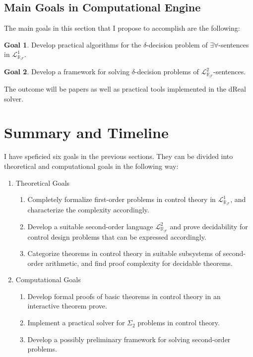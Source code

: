 \documentclass[10pt]{article}
\newcommand{\lrf}{\mathcal{L}_{\mathbb{R}_{\mathcal{F}}}}
\theoremstyle{definition}
\newtheorem{goal}{Goal}
\begin{document}
\subsection{Main Goals in Computational Engine}

The main goals in this section that I propose to accomplish are the following:
\begin{goal}
Develop practical algorithms for the $\delta$-decision problem of $\exists\forall$-sentences in $\lrf^1$.
\end{goal}
\begin{goal}
Develop a framework for solving $\delta$-decision problems of $\lrf^2$-sentences.
\end{goal}
The outcome will be papers as well as practical tools implemented in the dReal solver. 

\section{Summary and Timeline}\label{summary}

I have speficied six goals in the previous sections. They can be divided into theoretical and computational goals in the following way:
\begin{enumerate}
\item Theoretical Goals
\begin{enumerate}
\item Completely formalize first-order problems in control theory in $\lrf^1$, and characterize the complexity accordingly. 
\item Develop a suitable second-order language $\lrf^2$ and prove decidability for control design problems that can be expressed accordingly. 
\item Categorize theorems in control theory in suitable subsystems of second-order arithmetic, and find proof complexity for decidable theorems. 
\end{enumerate}
\item Computational Goals
\begin{enumerate}
\item Develop formal proofs of basic theorems in control theory in an interactive theorem prove.
\item Implement a practical solver for $\Sigma_2$ problems in control theory. 
\item Develop a possibly preliminary framework for solving second-order problems. 
\end{enumerate}
\end{enumerate}
\end{document}
